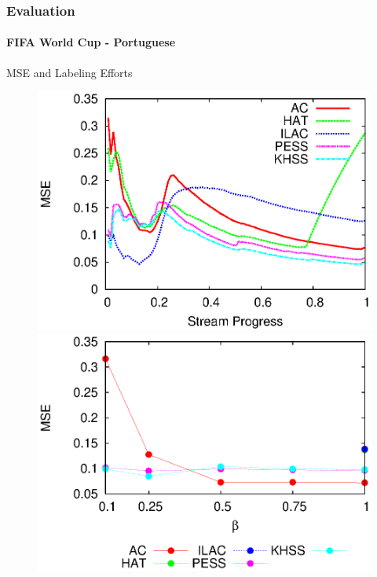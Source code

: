 \documentclass[14pt]{beamer}
\begin{document}
\begin{frame}
\frametitle{Evaluation}
\framesubtitle{FIFA World Cup - Portuguese}
MSE and Labeling Efforts
\begin{figure}[htp!]
\label{fig:fm_1}
\centering
\includegraphics[scale=0.45]{pt_mse.eps}
\includegraphics[scale=0.45]{pt_le_mse.eps}
\end{figure}
\end{frame}
\end{document}
